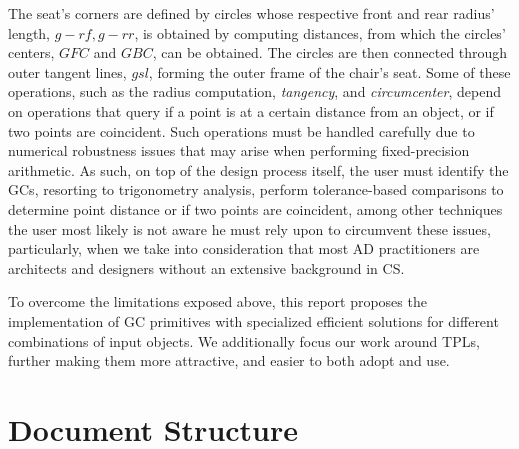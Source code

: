 The seat's corners are defined by circles whose respective front and rear
radius' length, $g-rf,g-rr$, is obtained by computing distances, from which the
circles' centers, $GFC$ and $GBC$, can be obtained.  The circles are then
connected through outer tangent lines, $gsl$, forming the outer frame of the
chair's seat.  Some of these operations, such as the radius computation,
\textit{tangency}, and \textit{circumcenter}, depend on operations that query if
a point is at a certain distance from an object, or if two points are
coincident.  Such operations must be handled carefully due to numerical
robustness issues that may arise when performing fixed-precision arithmetic.  As
such, on top of the design process itself, the user must identify the \acp{GC},
resorting to trigonometry analysis, perform tolerance-based comparisons to
determine point distance or if two points are coincident, among other techniques
the user most likely is not aware he must rely upon to circumvent these issues,
particularly, when we take into consideration that most \ac{AD} practitioners
are architects and designers without an extensive background in \ac{CS}.

To overcome the limitations exposed above, this report proposes the
implementation of \ac{GC} primitives with specialized efficient solutions for
different combinations of input objects.  We additionally focus our work around
\acp{TPL}, further making them more attractive, and easier to both adopt and
use.

\section{Document Structure}%
\label{sec:intro.structure}

